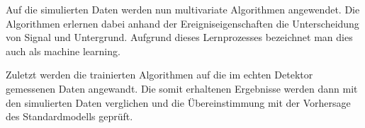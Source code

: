 Auf die simulierten Daten werden nun multivariate Algorithmen angewendet. Die Algorithmen erlernen dabei anhand der Ereigniseigenschaften die Unterscheidung von Signal und Untergrund. Aufgrund dieses Lernprozesses bezeichnet man dies auch als \glqq machine learning\grqq.

Zuletzt werden die trainierten Algorithmen auf die im echten Detektor gemessenen Daten angewandt. Die somit erhaltenen Ergebnisse werden dann mit den simulierten Daten verglichen und die \"Ubereinstimmung mit der Vorhersage des Standardmodells gepr\"uft.
